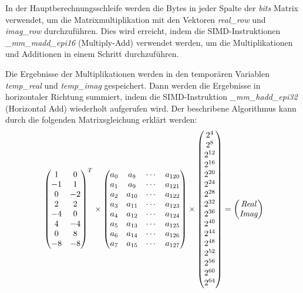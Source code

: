 \documentclass[course=erap]{aspdoc}
\begin{document}
In der Hauptberechnungsschleife werden die Bytes in jeder Spalte der \textit{bits} Matrix verwendet, um die Matrixmultiplikation mit den Vektoren \textit{real\_row} und \textit{imag\_row} durchzuführen. Dies wird erreicht, indem die SIMD-Instruktionen \textit{\_mm\_madd\_epi16} (Multiply-Add) verwendet werden, um die Multiplikationen und Additionen in einem Schritt durchzuführen.

Die Ergebnisse der Multiplikationen werden in den temporären Variablen \textit{temp\_real} und \textit{temp\_imag} gespeichert. Dann werden die Ergebnisse in horizontaler Richtung summiert, indem  die SIMD-Instruktion \textit{\_mm\_hadd\_epi32} (Horizontal Add) wiederholt aufgerufen wird.
\newpage
Der beschribene Algorithmus kann durch die folgenden Matrixsgleichung erklärt werden:
\[
\newline
\begin{pmatrix}
1 & 0 \\
-1 & 1 \\
0 & -2 \\
2 & 2 \\
-4 & 0 \\
4 & -4 \\
0 & 8 \\
-8 & -8 
\end{pmatrix}
^{T}
\times
\begin{pmatrix}
a_0 & a_8 & \cdots & a_{120} \\
a_1 & a_9 & \cdots & a_{121} \\
a_2 & a_{10} & \cdots & a_{122} \\
a_3 & a_{11} & \cdots & a_{123} \\
a_4 & a_{12} & \cdots & a_{124} \\
a_5 & a_{13} & \cdots & a_{125} \\
a_6 & a_{14} & \cdots & a_{126} \\
a_7 & a_{15} & \cdots & a_{127}
\end{pmatrix}
\times
\begin{pmatrix}
2^4 \\
2^8 \\
2^{12} \\
2^{16} \\
2^{20} \\
2^{24} \\
2^{28} \\
2^{32} \\
2^{36} \\
2^{40} \\
2^{44} \\
2^{48} \\
2^{52} \\
2^{56} \\
2^{60} \\
2^{64} 
\end{pmatrix}
=
\begin{pmatrix}
\textit{Real}\\
\textit{Imag} 
\end{pmatrix} 
\]
\newline
\newline
\end{document}
